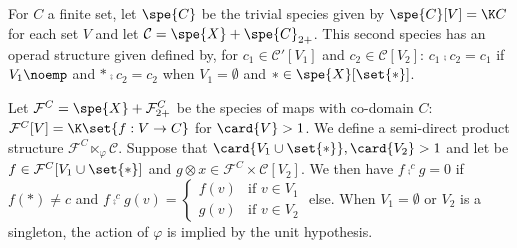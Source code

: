 \begin{exam}
    For $C$ a finite set, let $\spe{C}$ be the trivial species given by $\spe{C}[V]=\K C$ for each set $V$ 
    and let $\mathcal{C}=\spe{X}+\spe{C}_{2+}$. This second species has an operad structure given defined by, 
    for $c_1\in \mathcal{C}'[V_1]$ and $c_2\in \mathcal{C}[V_2]$: $c_1\comp c_2 = c_1$ if $V_1\noemp$ and 
    $\ast\comp c_2 = c_2$ when $V_1=\emptyset$ and $\ast\in\spe{X}[\set{\ast}]$. 

    Let $\mathcal{F}^C = \spe{X} + \mathcal{F}_{2+}^C$ be the species of maps with co-domain $C$: 
    $\mathcal{F}^C[V]=\K\set{f:V\to C}$ for $\card{V} > 1$. We define a semi-direct product structure 
    $\mathcal{F}^C\ltimes_{\varphi} \mathcal{C}$. Suppose that $\card{V_1\cup\set{\ast}},\card{V_2}>1$ and let 
    be $f\in \mathcal{F}^C[V_1\cup\set{\ast}]$ and $g\otimes x\in \mathcal{F}^C\times \mathcal{C}[V_2]$. We 
    then have $f\comp^c g = 0$ if $f(\ast) \not = c$ and 
    $f\comp^c g(v) = \left\{\begin{array}{rl}
    f(v)  & \text{if $v\in V_1$}    \\ 
    g(v)  & \text{if $v\in V_2$}\end{array}\right.$ 
    else. When $V_1=\emptyset$ or $V_2$ is a singleton, the action of $\varphi$ is implied by the 
    unit hypothesis. 
   

\end{exam}
